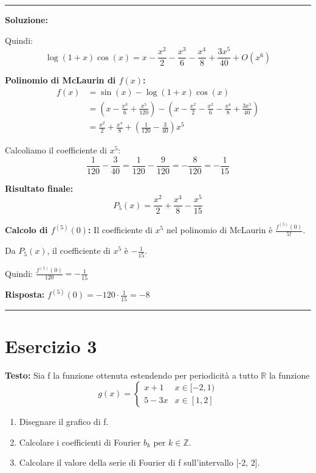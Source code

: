 \documentclass[12pt, a4paper]{article}
\newenvironment{solution}
{\par\noindent\rule{\textwidth}{0.4pt}\par\textbf{Soluzione:}\medskip\par}
{\par\rule{\textwidth}{0.4pt}\par\bigskip}
\begin{document}
\begin{solution}
Quindi:
\[
\log(1+x)\cos(x) = x - \frac{x^2}{2} - \frac{x^3}{6} - \frac{x^4}{8} + \frac{3x^5}{40} + O(x^6)
\]

\textbf{Polinomio di McLaurin di $f(x)$:}
\begin{align}
f(x) &= \sin(x) - \log(1+x)\cos(x) \\
&= \left(x - \frac{x^3}{6} + \frac{x^5}{120}\right) - \left(x - \frac{x^2}{2} - \frac{x^3}{6} - \frac{x^4}{8} + \frac{3x^5}{40}\right) \\
&= \frac{x^2}{2} + \frac{x^4}{8} + \left(\frac{1}{120} - \frac{3}{40}\right)x^5
\end{align}

Calcoliamo il coefficiente di $x^5$:
\[
\frac{1}{120} - \frac{3}{40} = \frac{1}{120} - \frac{9}{120} = -\frac{8}{120} = -\frac{1}{15}
\]

\textbf{Risultato finale:}
\[
P_5(x) = \frac{x^2}{2} + \frac{x^4}{8} - \frac{x^5}{15}
\]

\textbf{Calcolo di $f^{(5)}(0)$:}
Il coefficiente di $x^5$ nel polinomio di McLaurin è $\frac{f^{(5)}(0)}{5!}$.

Da $P_5(x)$, il coefficiente di $x^5$ è $-\frac{1}{15}$.

Quindi: $\frac{f^{(5)}(0)}{120} = -\frac{1}{15}$

\textbf{Risposta:} $f^{(5)}(0) = -120 \cdot \frac{1}{15} = -8$
\end{solution}

\newpage

\section*{Esercizio 3}

\textbf{Testo:} Sia f la funzione ottenuta estendendo per periodicità a tutto $\mathbb{R}$ la funzione
\[ g(x) = \begin{cases} x+1 & x \in [-2,1) \\ 5-3x & x \in [1,2] \end{cases} \]
\begin{enumerate}
    \item Disegnare il grafico di f.
    \item Calcolare i coefficienti di Fourier $b_{k}$ per $k \in \mathbb{Z}$.
    \item Calcolare il valore della serie di Fourier di f sull'intervallo [-2, 2].
\end{enumerate}
\end{document}

